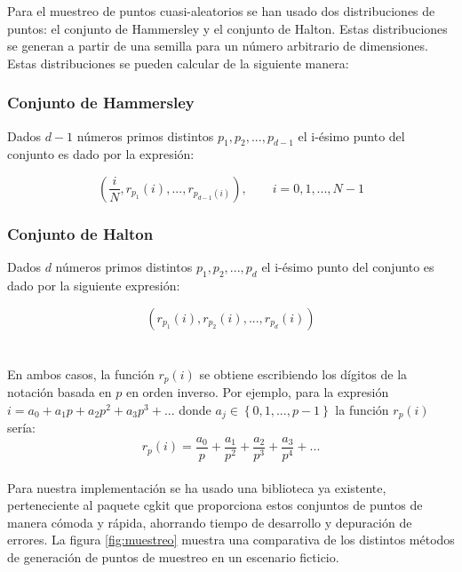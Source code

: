 Para el muestreo de puntos cuasi-aleatorios se han usado dos distribuciones de puntos: el conjunto de Hammersley y el conjunto de Halton. Estas distribuciones se generan a partir de una semilla para un número arbitrario de dimensiones. Estas distribuciones se pueden calcular de la siguiente manera:

\subsubsection{Conjunto de Hammersley}

Dados $d-1$ números primos distintos $p_1, p_2, ... , p_{d-1}$ el i-ésimo punto del conjunto es dado por la expresión:

\[ \left( \frac{i}{N}, r_{p_1}(i), ..., r_{p_{d-1}(i)} \right), \qquad i = 0, 1, ..., N-1\]

\subsubsection{Conjunto de Halton}

Dados $d$ números primos distintos $p_1, p_2, ..., p_d$ el i-ésimo punto del conjunto es dado por la siguiente expresión:

\[ \left( r_{p_1}(i),  r_{p_2}(i), ...,  r_{p_d}(i) \right) \]\\~\\

En ambos casos, la función $r_p(i)$ se obtiene  escribiendo los dígitos de la notación basada en $p$ en orden inverso. Por ejemplo, para la expresión $i = a_0 + a_1 p + a_2 p^2 + a_3 p^3 + ... $ donde $a_j \in \left\lbrace 0, 1, ... , p-1 \right\rbrace$ la función $r_p(i)$ sería:\\

\[ r_p(i) = \frac{a_0}{p} + \frac{a_1}{p^2} + \frac{a_2}{p^3} + \frac{a_3}{p^4} + ...\]\\


Para nuestra implementación se ha usado una biblioteca ya existente, perteneciente al paquete cgkit que proporciona estos conjuntos de puntos de manera cómoda y rápida, ahorrando tiempo de desarrollo y depuración de errores. La figura \ref{fig:muestreo} muestra una comparativa de los distintos métodos de generación de puntos de muestreo en un escenario ficticio.\\

